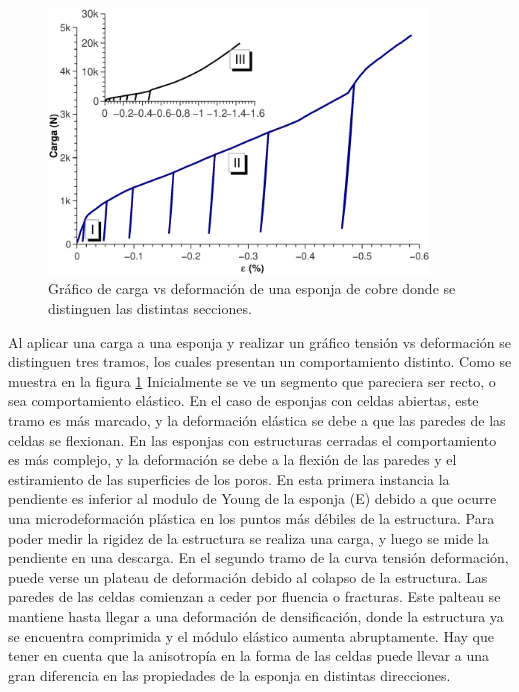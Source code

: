 \documentclass[a4paper,12pt,fleqn,twoside,openany]{book}
\begin{document}
\begin{figure}[h]
 \centering
 \includegraphics[width=0.9\textwidth]{Img/Introduccion/EspCu.eps}
 \caption{Gráfico de carga vs deformación de una esponja de cobre donde se distinguen las distintas secciones.}
 \label{fig:EspCu} 
\end{figure}

Al aplicar una carga a una esponja y realizar un gráfico tensión vs deformación se distinguen tres tramos, los cuales presentan un comportamiento 
distinto. Como se muestra en la figura \ref{fig:EspCu} Inicialmente se ve un segmento que pareciera ser recto, o sea comportamiento elástico. En el caso de esponjas con celdas abiertas, este tramo 
es más marcado, y la deformación elástica se debe a que las paredes de las celdas se flexionan. En las esponjas con estructuras cerradas el 
comportamiento es más complejo, y la deformación se debe a la flexión de las paredes y el estiramiento de las superficies de los poros. En esta primera 
instancia la pendiente es inferior al modulo de Young de la esponja (E) debido a que ocurre una microdeformación plástica en los puntos más débiles de la 
estructura. Para poder medir la rigidez de la estructura se realiza una carga, y luego se mide la pendiente en una descarga.
En el segundo tramo de la curva tensión deformación, puede verse un plateau de deformación debido al colapso de la estructura. Las paredes de las celdas 
comienzan a ceder por fluencia o fracturas. Este palteau se mantiene hasta llegar a una deformación de densificación, donde la estructura ya se encuentra 
comprimida y el módulo elástico aumenta abruptamente. Hay que tener en cuenta que la anisotropía en la forma de las celdas puede llevar a una gran diferencia 
en las propiedades de la esponja en distintas direcciones.
\end{document}
